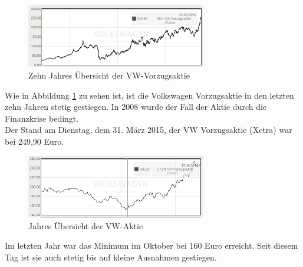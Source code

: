 \documentclass[12pt]{article}
\begin{document}
\begin{figure}[here!]
\centering
\includegraphics[width=0.7\textwidth]{images/finanzen2015}
\caption{Zehn Jahres Übersicht der VW-Vorzugsaktie \cite{aktienfotos}}
\label{fig:vwaktie1}
\end{figure}\FloatBarrier
\noindent
Wie in Abbildung \ref{fig:vwaktie1} zu sehen ist, ist die Volkswagen Vorzugsaktie in den letzten zehn Jahren stetig gestiegen. In 2008 wurde der Fall der Aktie durch die Finanzkrise bedingt.\\
Der Stand am Dienstag, dem 31. März 2015, der VW Vorzugsaktie (Xetra) war bei 249,90 Euro.
\begin{figure}[here!]
\centering
\includegraphics[width=0.7\textwidth]{images/finanzen20151}
\caption{Jahres Übersicht der VW-Aktie \cite{aktienfotos}}
\label{fig:vwaktie3}
\end{figure}\FloatBarrier
\noindent
Im letzten Jahr war das Minimum im Oktober bei 160 Euro erreicht. Seit diesem Tag ist sie auch stetig bis auf kleine Ausnahmen gestiegen.
\end{document}
